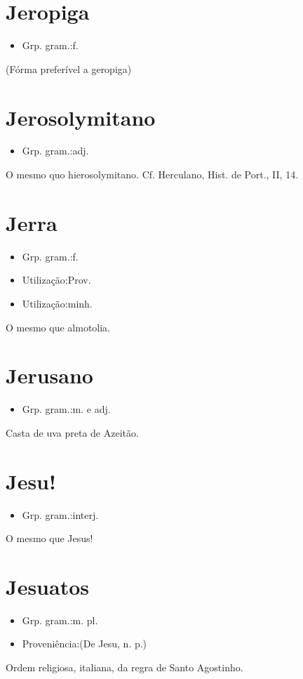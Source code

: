 \documentclass{article}
\begin{document}
\section{Jeropiga}
\begin{itemize}
\item {Grp. gram.:f.}
\end{itemize}
(Fórma preferível a \textunderscore geropiga\textunderscore )
\section{Jerosolymitano}
\begin{itemize}
\item {Grp. gram.:adj.}
\end{itemize}
O mesmo quo \textunderscore hierosolymitano\textunderscore . Cf. Herculano, \textunderscore Hist. de Port.\textunderscore , II, 14.
\section{Jerra}
\begin{itemize}
\item {Grp. gram.:f.}
\end{itemize}
\begin{itemize}
\item {Utilização:Prov.}
\end{itemize}
\begin{itemize}
\item {Utilização:minh.}
\end{itemize}
O mesmo que \textunderscore almotolia\textunderscore .
\section{Jerusano}
\begin{itemize}
\item {Grp. gram.:m.  e  adj.}
\end{itemize}
Casta de uva preta de Azeitão.
\section{Jesu!}
\begin{itemize}
\item {Grp. gram.:interj.}
\end{itemize}
O mesmo que \textunderscore Jesus!\textunderscore 
\section{Jesuatos}
\begin{itemize}
\item {Grp. gram.:m. pl.}
\end{itemize}
\begin{itemize}
\item {Proveniência:(De \textunderscore Jesu\textunderscore , n. p.)}
\end{itemize}
Ordem religiosa, italiana, da regra de Santo Agostinho.
\end{document}
